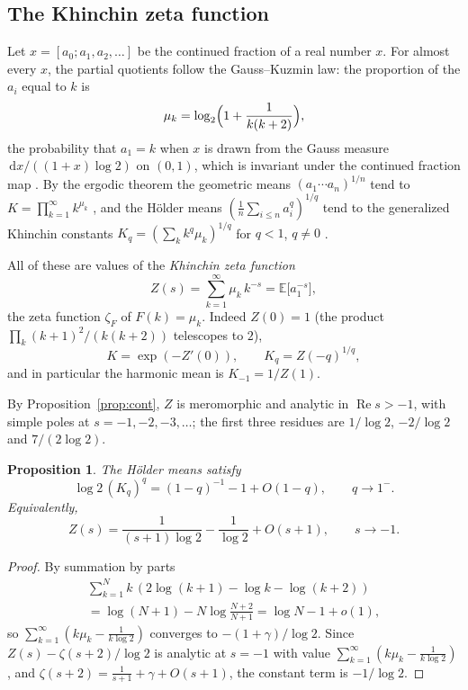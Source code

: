 \documentclass[11pt,reqno]{amsart}
\newtheorem{proposition}[theorem]{Proposition}
\theoremstyle{definition}
\theoremstyle{remark}
\newcommand{\dd}{\,\mathrm{d}}
\begin{document}
\subsection{The Khinchin zeta function}\label{sec:khinchinzeta}

Let $x = [a_0; a_1, a_2, \dots]$ be the continued fraction of a real number $x$. For almost every $x$, the partial
quotients follow the Gauss--Kuzmin law: the proportion of the $a_i$ equal to $k$ is
\[
\mu_k = \log_2\Bigl(1 + \frac1{k(k+2)}\Bigr),
\]
the probability that
$a_1 = k$ when $x$ is drawn from the Gauss measure $\dd x/((1+x)\log2)$ on $(0,1)$, which is invariant under the
continued fraction map \cite{Khi64,IK02}. By the ergodic theorem the geometric means $(a_1\cdots a_n)^{1/n}$ tend
to $K = \prod_{k=1}^{\infty}k^{\mu_k}$ \cite{Khi35}, and the H\"older means $(\frac1n\sum_{i\le n}a_i^q)^{1/q}$ tend to
the generalized Khinchin constants $K_q = (\sum_kk^q\mu_k)^{1/q}$ for $q < 1$, $q \ne 0$ \cite{BBC97}.

All of these are values of the
\emph{Khinchin zeta function}
\begin{equation}\label{eq:Z}
  Z(s) = \sum_{k=1}^{\infty} \mu_k\,k^{-s} = \mathbb{E}\bigl[a_1^{-s}\bigr],
\end{equation}
the zeta function $\zeta_F$ of $F(k) = \mu_k$.
Indeed $Z(0) = 1$ (the product
$\prod_k(k+1)^2/(k(k+2))$ telescopes to $2$),
\[
  K = \exp(-Z'(0)), \qquad K_q = Z(-q)^{1/q},
\]
and in particular the harmonic mean is $K_{-1} = 1/Z(1)$.

By Proposition~\ref{prop:cont}, $Z$ is meromorphic and analytic in $\operatorname{Re}s > -1$, with simple poles at
$s = -1, -2, -3, \dots$; the first three residues are $1/\log 2$, $-2/\log 2$ and $7/(2\log 2)$.

\begin{proposition}\label{prop:Z}
The H\"older means
satisfy
\[
\log 2\,(K_q)^q = (1-q)^{-1} - 1 + O(1-q), \qquad q \to 1^-.
\]
Equivalently,
\[
Z(s) = \dfrac{1}{(s+1)\log2} - \dfrac{1}{\log2} + O(s+1), \qquad s \to -1.
\]
\end{proposition}

\begin{proof}
By summation by parts
\begin{multline*}
\sum_{k=1}^{N}k\,(2\log(k+1) - \log k - \log(k+2)) \\ = \log(N+1) - N\log\frac{N+2}{N+1} = \log N - 1 + o(1),
\end{multline*}
so $\sum_{k=1}^{\infty}(k\mu_k - \frac{1}{k\log2})$ converges to $-(1+\gamma)/\log 2$.
Since $Z(s) - \zeta(s+2)/\log 2$ is analytic at
$s = -1$ with value $\sum_{k=1}^{\infty}(k\mu_k - \frac1{k\log 2})$, and $\zeta(s+2) = \tfrac{1}{s+1} + \gamma + O(s+1)$, the constant term
is $-1/\log 2$.
\end{proof}
\end{document}
